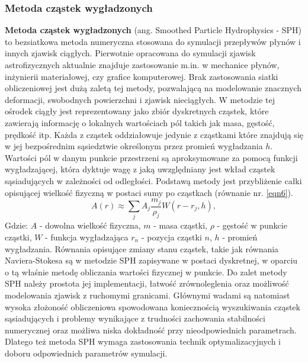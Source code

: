\documentclass{article}
\begin{document}
\subsubsection{Metoda cząstek wygładzonych}
\textbf{Metoda cząstek wygładzonych} (ang. Smoothed Particle Hydrophysics - SPH)\cite{sph} to bezsiatkowa metoda numeryczna stosowana do symulacji przepływów płynów i innych zjawisk ciągłych. Pierwotnie opracowana do symulacji zjawisk astrofizycznych aktualnie znajduje zastosowanie m.in. w mechanice płynów, inżynierii materiałowej, czy grafice komputerowej. Brak zastosowania siatki obliczeniowej jest dużą zaletą tej metody, pozwalającą na modelowanie znacznych deformacji, swobodnych powierzchni i zjawisk nieciągłych.\newline\newline
\indent
W metodzie tej ośrodek ciągły jest reprezentowany jako zbiór dyskretnych cząstek, które zawierają informację o lokalnych wartościach pól takich jak masa, gęstość, prędkość itp. Każda z cząstek oddziałowuje jedynie z cząstkami które znajdują się w jej bezpośrednim sąsiedztwie określonym przez promień wygładzania $h$. Wartości pól w danym punkcie przestrzeni są aproksymowane za pomocą funkcji wygładzającej, która dyktuje wagę z jaką uwzględniany jest wkład cząstek sąsiadujących w zależności od odległości.\newline\newline
Podstawą metody jest przybliżenie całki opisującej wielkość fizyczną w postaci sumy po cząstkach (równanie nr. \ref{eqn6}).\newline
\begin{equation}\label{eqn6}
A(r) \approx \sum_{j}A_j \frac{m_j}{\rho_j}W(r-r_j,h),
\end{equation}
\indent
Gdzie:\newline
$A$ - dowolna wielkość fizyczna,\newline
$m$ - masa cząstki,\newline
$\rho$ - gęstość w punkcie cząstki,\newline
$W$ - funkcja wygładzająca\newline
$r_n$ - pozycja cząstki $n$,\newline
$h$ - promień wygładzania.\newline\newline
Równania opisujące zmiany stanu cząstek, takie jak równania Naviera-Stokesa są w metodzie SPH zapisywane w postaci dyskretnej, 
w oparciu o tą właśnie metodę obliczania wartości fizycznej w punkcie.\newline
Do zalet metody SPH należy prostota jej implementacji, łatwość zrównoleglenia oraz możliwość modelowania zjawisk z ruchomymi granicami.\newline
Głównymi wadami są natomiast wysoka złożoność obliczeniowa spowodowana koniecznością wyszukiwania cząstek sąsiadujących 
i problemy wynikające z trudności zachowania stabilności numerycznej oraz możliwa niska dokładność przy nieodpowiednich parametrach.\newline
Dlatego też metoda SPH wymaga zastosowania technik optymalizacyjnych i doboru odpowiednich parametrów symulacji.\newline
\end{document}
